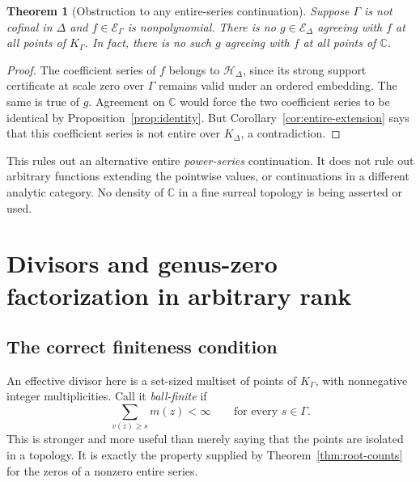 \documentclass[11pt,letterpaper]{article}
\numberwithin{equation}{section}
\newtheorem{theorem}{Theorem}[section]
\theoremstyle{definition}
\theoremstyle{remark}
\newcommand{\C}{\mathbb C}
\begin{document}
\begin{theorem}[Obstruction to any entire-series continuation]
\label{thm:no-continuation}
Suppose $\Gamma$ is not cofinal in $\Delta$ and
$f\in\mathcal E_\Gamma$ is nonpolynomial. There is no
$g\in\mathcal E_\Delta$ agreeing with $f$ at all points of $K_\Gamma$.
In fact, there is no such $g$ agreeing with $f$ at all points of $\C$.
\end{theorem}
\begin{proof}
The coefficient series of $f$ belongs to $\mathcal H_\Delta$, since its
strong support certificate at scale zero over $\Gamma$ remains valid under
an ordered embedding. The same is true of $g$. Agreement on $\C$ would force
the two coefficient series to be identical by Proposition~\ref{prop:identity}.
But Corollary~\ref{cor:entire-extension} says that this coefficient series
is not entire over $K_\Delta$, a contradiction.
\end{proof}

This rules out an alternative entire \emph{power-series} continuation.
It does not rule out arbitrary functions extending the pointwise values,
or continuations in a different analytic category. No density of $\C$ in
a fine surreal topology is being asserted or used.

\section{Divisors and genus-zero factorization in arbitrary rank}
\label{sec:divisors}

\subsection{The correct finiteness condition}
An effective divisor here is a set-sized multiset of points of $K_\Gamma$,
with nonnegative integer multiplicities. Call it \emph{ball-finite} if
\begin{equation}\label{eq:ball-finite}
 \sum_{v(z)\ge s}m(z)<\infty\qquad\text{for every }s\in\Gamma.
\end{equation}
This is stronger and more useful than merely saying that the points are
isolated in a topology. It is exactly the property supplied by
Theorem~\ref{thm:root-counts} for the zeros of a nonzero entire series.
\end{document}
